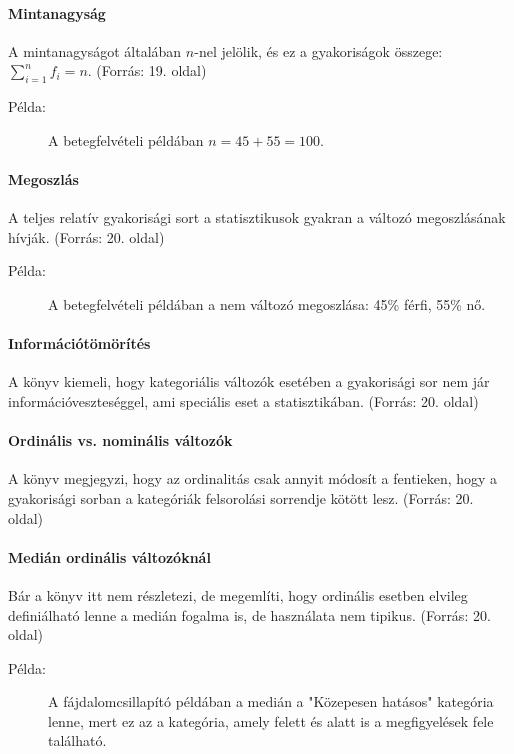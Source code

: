 \documentclass[a4paper,12pt]{article}
\begin{document}
    \paragraph{Mintanagyság}
    A mintanagyságot általában $n$-nel jelölik, és ez a gyakoriságok összege: $\sum_{i=1}^n f_i = n$.
    (Forrás: 19. oldal)

    \begin{description}
        \item[Példa:] A betegfelvételi példában $n = 45 + 55 = 100$.
    \end{description}

    \paragraph{Megoszlás}
    A teljes relatív gyakorisági sort a statisztikusok gyakran a változó megoszlásának hívják.
    (Forrás: 20. oldal)

    \begin{description}
        \item[Példa:] A betegfelvételi példában a nem változó megoszlása: 45\% férfi, 55\% nő.
    \end{description}

    \paragraph{Információtömörítés}
    A könyv kiemeli, hogy kategoriális változók esetében a gyakorisági sor nem jár információveszteséggel, ami speciális eset a statisztikában.
    (Forrás: 20. oldal)

    \paragraph{Ordinális vs. nominális változók}
    A könyv megjegyzi, hogy az ordinalitás csak annyit módosít a fentieken, hogy a gyakorisági sorban a kategóriák felsorolási sorrendje kötött lesz.
    (Forrás: 20. oldal)

    \paragraph{Medián ordinális változóknál}
    Bár a könyv itt nem részletezi, de megemlíti, hogy ordinális esetben elvileg definiálható lenne a medián fogalma is, de használata nem tipikus.
    (Forrás: 20. oldal)

    \begin{description}
        \item[Példa:] A fájdalomcsillapító példában a medián a "Közepesen hatásos" kategória lenne, mert ez az a kategória, amely felett és alatt is a megfigyelések fele található.
    \end{description}
\end{document}
